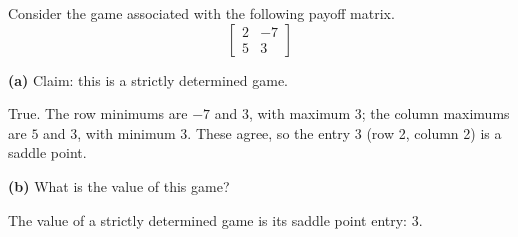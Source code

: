 \documentclass[12pt]{ximera}
\begin{document}
\begin{problem}
Consider the game associated with the following payoff matrix.
\[
\begin{bmatrix} 2 & -7\\ 5 & 3 \end{bmatrix}
\]

\begin{prompt}
\textbf{(a)} Claim: this is a strictly determined game.

\begin{multipleChoice}
\end{multipleChoice}

\begin{feedback}
True. The row minimums are $-7$ and $3$, with maximum $3$; the column maximums are $5$
and $3$, with minimum $3$. These agree, so the entry $3$ (row 2, column 2) is a saddle
point.
\end{feedback}
\end{prompt}

\begin{prompt}
\textbf{(b)} What is the value of this game?

\begin{multipleChoice}
\end{multipleChoice}

\begin{feedback}
The value of a strictly determined game is its saddle point entry: $3$.
\end{feedback}
\end{prompt}
\end{problem}
\end{document}
